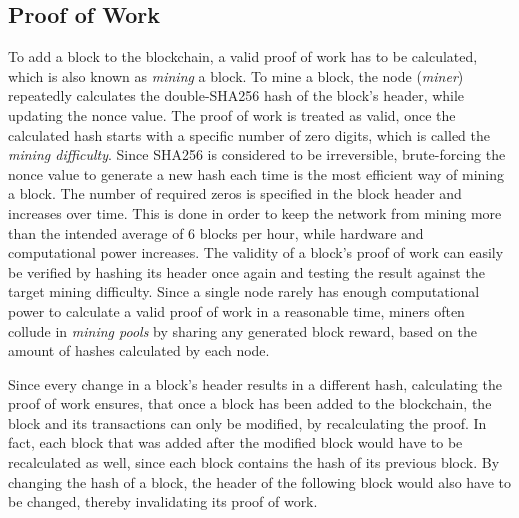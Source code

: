 \documentclass[a4paper,12pt,twoside]{report}
\begin{document}
\subsection{Proof of Work} \label{pow}
To add a block to the blockchain, a valid proof of work has to be calculated, which is also known as \textit{mining} a block. To mine a block, the node (\textit{miner}) repeatedly calculates the double-SHA256 hash of the block's header, while updating the nonce value. The proof of work is treated as valid, once the calculated hash starts with a specific number of zero digits, which is called the \textit{mining difficulty}. Since SHA256 is considered to be irreversible, brute-forcing the nonce value to generate a new hash each time is the most efficient way of mining a block. The number of required zeros is specified in the block header and increases over time. This is done in order to keep the network from mining more than the intended average of 6 blocks per hour, while hardware and computational power increases. The validity of a block's proof of work can easily be verified by hashing its header once again and testing the result against the target mining difficulty. Since a single node rarely has enough computational power to calculate a valid proof of work in a reasonable time, miners often collude in \textit{mining pools} by sharing any generated block reward, based on the amount of hashes calculated by each node. \cite{antonopoulos2017mastering,okupski2014bitcoin}

Since every change in a block's header results in a different hash, calculating the proof of work ensures, that once a block has been added to the blockchain, the block and its transactions can only be modified, by recalculating the proof. In fact, each block that was added after the modified block would have to be recalculated as well, since each block contains the hash of its previous block. By changing the hash of a block, the header of the following block would also have to be changed, thereby invalidating its proof of work. \cite{nakamoto2008bitcoin}
\end{document}
